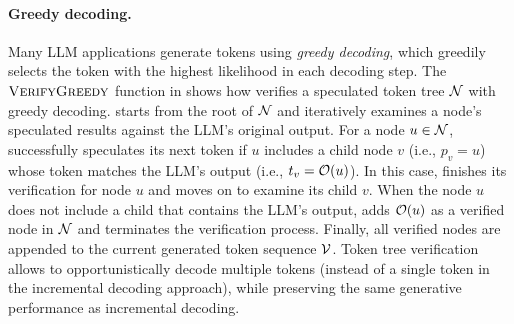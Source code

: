 \paragraph{Greedy decoding.}
Many LLM applications generate tokens using {\em greedy decoding}, which greedily selects the token with the highest likelihood in each decoding step.
The $\textproc{VerifyGreedy}$ function in  shows how \Sys verifies a speculated token tree $\mathcal{N}$ with greedy decoding.
\Sys starts from the root of $\mathcal{N}$ and iteratively examines a node's speculated results against the LLM's original output.
For a node $u\in\mathcal{N}$, \Sys successfully speculates its next token if $u$ includes a child node $v$ (i.e., $p_v = u$) whose token matches the LLM's output (i.e., $t_v = \mathcal{O}(u)$).
In this case, \Sys finishes its verification for node $u$ and moves on to examine its child $v$.
When the node $u$ does not include a child that contains the LLM's output, \Sys adds $\mathcal{O}(u)$ as a verified node in $\mathcal{N}$ and terminates the verification process.
Finally, all verified nodes are appended to the current generated token sequence $\mathcal{V}$.
Token tree verification allows \Sys to opportunistically decode multiple tokens (instead of a single token in the incremental decoding approach), while preserving the same generative performance as incremental decoding.

